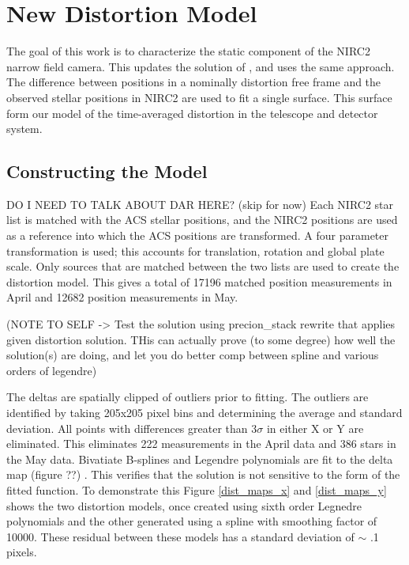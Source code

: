 \section{New Distortion Model}
The goal of this work is to characterize the static component of the NIRC2 narrow field camera.  This updates the solution of \cite{Yelda_2010}, and uses the same approach.  The difference between positions in a nominally distortion free frame and the observed stellar positions in NIRC2 are used to fit a single surface.  This surface form our model of the time-averaged distortion  in the telescope and detector system.

\subsection{Constructing the Model}
DO I NEED TO TALK ABOUT DAR HERE? (skip for now)
Each NIRC2 star list is matched with the ACS stellar positions, and the NIRC2 positions are used as a reference into which the ACS positions are transformed.  A four parameter transformation is used; this accounts for translation, rotation and global plate scale.  Only sources that are matched between the two lists are used to create the distortion model.  This gives a total of 17196 matched position measurements in April and 12682 position measurements in May.  

(NOTE TO SELF -> Test the solution using precion_stack rewrite that applies given distortion solution.  THis can actually prove (to some degree) how well the solution(s) are doing, and let you do better comp between spline and various orders of legendre)

The deltas are spatially clipped of outliers prior to fitting.  The outliers are identified by taking 205x205 pixel bins  and determining the average and standard deviation.  All points with differences greater than $3\sigma$ in either X or Y are eliminated.  This eliminates 222 measurements in the April data and 386 stars in the May data.
Bivatiate B-splines and Legendre polynomials are fit to the delta map (figure ??) .  This verifies that the solution is not sensitive to the form of the fitted function.  To demonstrate this Figure \ref{dist_maps_x} and \ref{dist_maps_y} shows the two distortion models, once created using sixth order Legnedre polynomials and the other generated using a spline with smoothing factor of 10000.  These residual between these models has a standard deviation of $\sim$ .1 pixels. 

